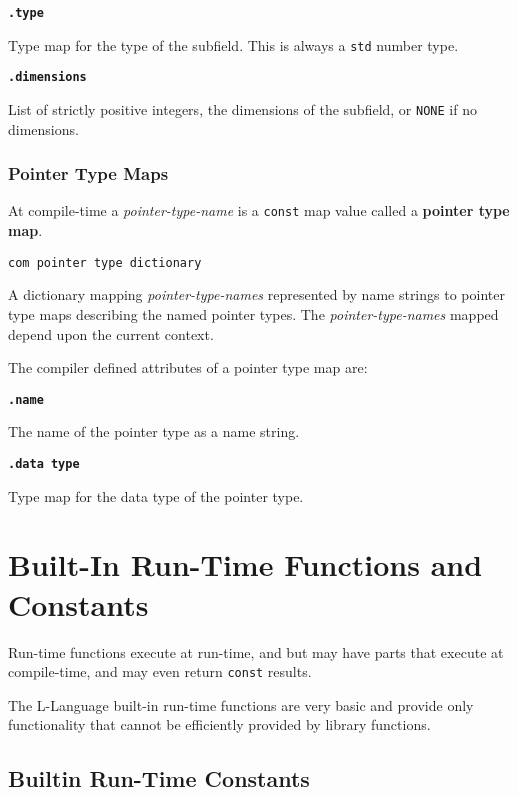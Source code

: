 \documentclass[12pt]{article}
\newcommand{\key}[1]{{\rm \bfseries #1}}
\newcommand{\ttkey}[1]{{\tt \bfseries #1}}
\newenvironment{indpar}[1][0.3in]%
	{\begin{list}{}%
		     {\setlength{\itemsep}{0in}%
		      \setlength{\topsep}{0in}%
		      \setlength{\parsep}{1ex}%
		      \setlength{\labelwidth}{#1}%
		      \setlength{\leftmargin}{#1}%
		      \addtolength{\leftmargin}{\labelsep}}%
	 \item}%
	{\end{list}}
\begin{document}
\ttkey{.type}
\begin{indpar}
Type map for the type of the subfield.
This is always a {\tt std} number type.
\end{indpar}

\ttkey{.dimensions}
\begin{indpar}
List of strictly positive integers,
the dimensions of the subfield, or {\tt NONE} if no dimensions.
\end{indpar}

\subsubsection{Pointer Type Maps}
\label{POINTER-TYPE-MAPS}

At compile-time a {\em pointer-type-name} is a {\tt const} map value
called a \key{pointer type map}.

{\tt com pointer type dictionary}
\begin{indpar}
A dictionary mapping {\em pointer-type-names}
represented by name strings to pointer type maps describing the
named pointer types.  The {\em pointer-type-names} mapped depend upon
the current context.
\end{indpar}

The compiler defined attributes of a pointer type map are:

\ttkey{.name}
\begin{indpar}
The name of the pointer type as a name string.
\end{indpar}

\ttkey{.data type}
\begin{indpar}
Type map for the data type of the pointer type.
\end{indpar}

\section{Built-In Run-Time Functions and Constants}

Run-time functions execute at run-time, and but may have
parts that execute at compile-time, and may even return
{\tt const} results.

The L-Language built-in run-time functions are very basic
and provide only functionality that cannot be efficiently
provided by library functions.

\subsection{Builtin Run-Time Constants}
\label{BUILTIN-RUN-TIME-CONSTANTS}
\end{document}

